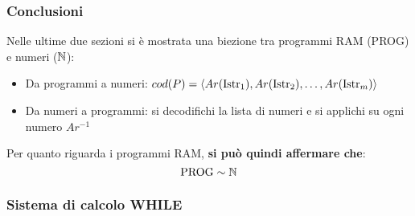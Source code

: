 \subsubsection*{Conclusioni}
Nelle ultime due sezioni si è mostrata una biezione tra programmi RAM (PROG) e numeri
($\mathbb{N}$):
    \begin{itemize}
        \item Da programmi a numeri:
            $cod(P)=\langle Ar(\text{Istr}_1),Ar(\text{Istr}_2),\dots,Ar(\text{Istr}_m)\rangle$
        \item Da numeri a programmi: si decodifichi la lista di numeri e si applichi su
            ogni numero $Ar^{-1}$
    \end{itemize}
Per quanto riguarda i programmi RAM, \textbf{si può quindi affermare che}:
$$ \text{PROG} \sim \mathbb{N} $$

\subsubsection{Sistema di calcolo WHILE}